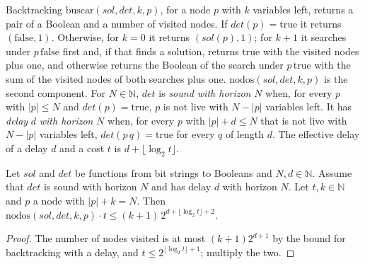 \begin{definition}
  \label{def:search-demoran}
  \leanok
  Backtracking $\mathrm{buscar}(\mathit{sol}, \mathit{det}, k, p)$, for a node $p$ with $k$
  variables left, returns a pair of a Boolean and a number of visited nodes. If
  $\mathit{det}(p) = \mathrm{true}$ it returns $(\mathrm{false}, 1)$. Otherwise, for $k = 0$ it
  returns $(\mathit{sol}(p), 1)$; for $k + 1$ it searches under $p\,\mathrm{false}$ first and, if that
  finds a solution, returns true with the visited nodes plus one, and otherwise returns the
  Boolean of the search under $p\,\mathrm{true}$ with the sum of the visited nodes of both searches
  plus one. $\mathrm{nodos}(\mathit{sol}, \mathit{det}, k, p)$ is the second component. For $N \in
  \mathbb{N}$, $\mathit{det}$ is \emph{sound with horizon} $N$ when, for every $p$ with
  $|p| \le N$ and $\mathit{det}(p) = \mathrm{true}$, $p$ is not live with $N - |p|$ variables left.
  It has \emph{delay} $d$ \emph{with horizon} $N$ when, for every $p$ with $|p| + d \le N$ that is not
  live with $N - |p|$ variables left, $\mathit{det}(p\,q) = \mathrm{true}$ for every $q$ of length
  $d$. The effective delay of a delay $d$ and a cost $t$ is $d + \lfloor \log_2 t \rfloor$.
  \own{}
\end{definition}

\begin{theorem}
  \label{thm:search-costo-demora-efectiva}
  \leanok
  Let $\mathit{sol}$ and $\mathit{det}$ be functions from bit strings to Booleans and
  $N, d \in \mathbb{N}$. Assume that $\mathit{det}$ is sound with horizon $N$ and has delay $d$ with
  horizon $N$. Let $t, k \in \mathbb{N}$ and $p$ a node with $|p| + k = N$. Then
  $\mathrm{nodos}(\mathit{sol}, \mathit{det}, k, p) \cdot t \le (k+1)\, 2^{d + \lfloor \log_2 t \rfloor + 2}$.
  \own{}
\end{theorem}

\begin{proof}
  \leanok
  The number of nodes visited is at most $(k+1)2^{d+1}$ by the bound for backtracking with a delay,
  and $t \le 2^{\lfloor \log_2 t \rfloor + 1}$; multiply the two.
\end{proof}

